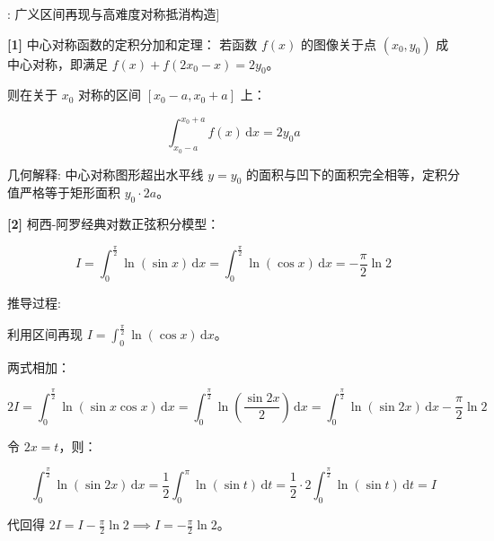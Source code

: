 \documentclass[11pt,a4paper,UTF8]{ctexart}
\begin{document}
\begin{thmbox}[模型[1]: 广义区间再现与高难度对称抵消构造]

\textbf{[1]} 中心对称函数的定积分加和定理：
若函数 $f(x)$ 的图像关于点 $(x_0, y_0)$ 成中心对称，即满足 $f(x) + f(2x_0 - x) = 2y_0$。

则在关于 $x_0$ 对称的区间 $[x_0 - a, x_0 + a]$ 上：


\begin{equation*}
\int_{x_0 - a}^{x_0 + a} f(x)\,\mathrm{d}x = 2y_0 a
\end{equation*}


几何解释: 中心对称图形超出水平线 $y = y_0$ 的面积与凹下的面积完全相等，定积分值严格等于矩形面积 $y_0 \cdot 2a$。

\textbf{[2]} 柯西-阿罗经典对数正弦积分模型：

\begin{equation*}
I = \int_0^{\frac{\pi}{2}} \ln(\sin x)\,\mathrm{d}x = \int_0^{\frac{\pi}{2}} \ln(\cos x)\,\mathrm{d}x = -\frac{\pi}{2}\ln 2
\end{equation*}


推导过程:

利用区间再现 $I = \int_0^{\frac{\pi}{2}} \ln(\cos x)\,\mathrm{d}x$。

两式相加：


\begin{equation*}
2I = \int_0^{\frac{\pi}{2}} \ln(\sin x\cos x)\,\mathrm{d}x = \int_0^{\frac{\pi}{2}} \ln\left(\frac{\sin 2x}{2}\right)\,\mathrm{d}x = \int_0^{\frac{\pi}{2}} \ln(\sin 2x)\,\mathrm{d}x - \frac{\pi}{2}\ln 2
\end{equation*}


令 $2x = t$，则：


\begin{equation*}
\int_0^{\frac{\pi}{2}} \ln(\sin 2x)\,\mathrm{d}x = \frac{1}{2}\int_0^\pi \ln(\sin t)\,\mathrm{d}t = \frac{1}{2} \cdot 2\int_0^{\frac{\pi}{2}} \ln(\sin t)\,\mathrm{d}t = I
\end{equation*}


代回得 $2I = I - \frac{\pi}{2}\ln 2 \implies I = -\frac{\pi}{2}\ln 2$。

\end{thmbox}
\end{document}
